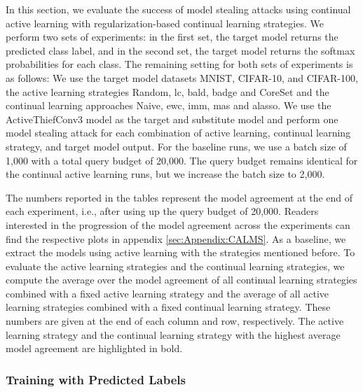 In this section, we evaluate the success of model stealing attacks using continual active learning with regularization-based continual learning strategies. 
We perform two sets of experiments: in the first set, the target model returns the predicted class label, and in the second set, the target model returns the
softmax probabilities for each class. The remaining setting for both sets of experiments is as follows: We use the target model datasets MNIST, CIFAR-10, and CIFAR-100,
the active learning strategies Random, \gls{lc}, \gls{bald}, \gls{badge} and CoreSet and the continual learning approaches Naive, \gls{ewc}, \gls{imm}, \gls{mas} and
\gls{alasso}. We use the ActiveThiefConv3 model as the target and substitute model and perform one model stealing attack for each combination of active learning,
continual learning strategy, and target model output. For the baseline runs, we use a batch size of 1,000 with a total query budget of 20,000. The query budget remains identical
for the continual active learning runs, but we increase the batch size to 2,000. \par
The numbers reported in the tables represent the model agreement at the end of each experiment, i.e., after using up the query budget of 20,000. Readers interested
in the progression of the model agreement across the experiments can find the respective plots in appendix \ref{sec:Appendix:CALMS}. As a baseline, we extract the models
using active learning with the strategies mentioned before. To evaluate the active learning strategies and the continual learning strategies, we compute the average
over the model agreement of all continual learning strategies combined with a fixed active learning strategy and the average of all active learning strategies combined
with a fixed continual learning strategy. These numbers are given at the end of each column and row, respectively. The active learning strategy and the continual
learning strategy with the highest average model agreement are highlighted in bold. \par


\subsubsection{Training with Predicted Labels}
\label{sec:Evaluation:MS:Regularization:Predicted}

